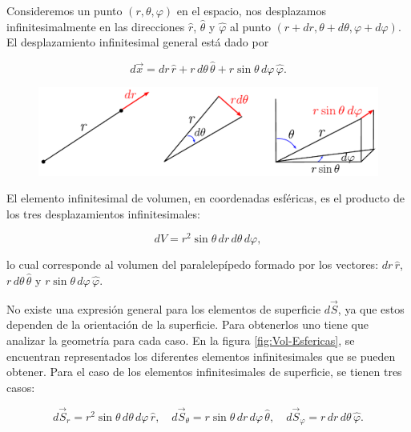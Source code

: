 Consideremos un punto $(r,\theta, \varphi)$ en el espacio, nos desplazamos infinitesimalmente en las direcciones $\hat{r}$, $\hat{\theta}$ y $\hat{\varphi}$ al punto $(r + dr, \theta + d\theta, \varphi + d\varphi)$. El desplazamiento infinitesimal general está dado por
\begin{shaded}
    $$d\Vec{x} = dr \, \hat{r} + r \,d\theta \,\hat{\theta} + r \sin \theta \,d\varphi \,\hat{\varphi}.$$
\end{shaded}

\begin{figure}[H]
    \centering
    \includegraphics[scale = 0.7]{Figuras/Elemento-Esferica.pdf}
    \caption{}
    \label{fig:Elemento-Esferica}
\end{figure}

El elemento infinitesimal de volumen, en coordenadas esféricas, es el producto de los tres desplazamientos infinitesimales:
\begin{shaded}
\begin{equation}
dV = r^2 \sin \theta \,dr\,d\theta\,d\varphi,
\end{equation}
\end{shaded}
lo cual corresponde al volumen del paralelepípedo formado por los vectores: $dr \,\hat{r}$, $r \,d\theta \, \hat{\theta}$ y $r \sin \theta \,d\varphi \, \hat{\varphi}$.

No existe una expresión general para los elementos de superficie $d\Vec{S}$, ya que estos dependen de la orientación de la superficie. Para obtenerlos uno tiene que analizar la geometría para cada caso. En la figura \ref{fig:Vol-Esfericas}, se encuentran representados los diferentes elementos infinitesimales que se pueden obtener. Para el caso de los elementos infinitesimales  de superficie, se tienen tres casos:
\begin{shaded}
  \begin{equation*}
d\vec{S}_r = r^2 \sin \theta\, d\theta\, d\varphi \,\hat{r} ,\quad d\vec{S}_{\theta} = r \sin\theta \,dr \,d \varphi \,\hat{\theta}, \quad  d\vec{S}_{\varphi} = r \,dr\, d\theta \,\hat{\varphi}.
\end{equation*}  
\end{shaded}

